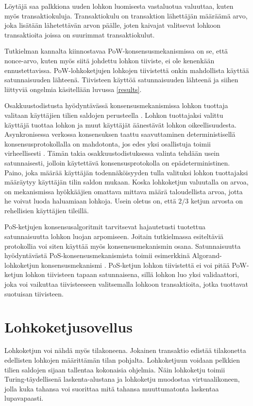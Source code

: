 Löytäjä saa palkkiona uuden lohkon luomisesta vastaluotua valuuttaa, kuten myös transaktiokuluja. Transaktiokulu on transaktion lähettäjän määräämä arvo, joka lisätään lähetettävän arvon päälle, joten kaivajat valitsevat lohkoon transaktioita joissa on suurimmat transaktiokulut.

Tutkielman kannalta kiinnostavaa PoW-konsensusmekanismissa on se, että nonce-arvo, kuten myös siitä johdettu lohkon tiiviste, ei ole kenenkään ennustettavissa. PoW-lohkoketjujen lohkojen tiivistettä onkin mahdollista käyttää satunnaisuuden lähteenä. Tiivisteen käyttöä satunnaisuuden lähteenä ja siihen liittyviä ongelmia käsitellään luvussa \ref{results}.


Osakkuustodistusta hyödyntävässä konsensusmekanismissa lohkon tuottaja valitaan käyttäjien tilien saldojen perusteella \cite{NguyenCongT2019PCMf}. Lohkon tuottajaksi valittu käyttäjä tuottaa lohkon ja muut käyttäjät äänestävät lohkon oikeellisuudesta. Asynkronisessa verkossa konsensuksen taattu saavuttaminen deterministisellä konsensusprotokollalla on mahdotonta, jos edes yksi osallistuja toimii virheellisesti \cite{fischer_impossibility_1985}. Tämän takia osakkuustodistuksessa valinta tehdään usein satunnaisesti, jolloin käytettävä konsensusprotokolla on epädeterministinen. Paino, joka määrää käyttäjän todennäköisyyden tulla valituksi lohkon tuottajaksi määräytyy käyttäjän tilin saldon mukaan. Koska lohkoketjun valuutalla on arvoa, on mekanismissa hyökkääjien omattava mittava määrä taloudellista arvoa, jotta he voivat luoda haluamiaan lohkoja. Usein oletus on, että $2/3$ ketjun arvosta on rehellisien käyttäjien tileillä. 

 PoS-ketjujen konsensusalgoritmit tarvitsevat hajautetusti tuotettua satunnaisuutta lohkon luojan arpomiseen. Joitain tutkielmassa esiteltäviä protokollia voi siten käyttää myös konsensusmekanismin osana. Satunnaisuutta hyödyntävästä PoS-konsensusmekanismista toimii esimerkkinä Algorand-lohkoketjun konsensusmekanismi \cite{gilad_algorand_2017}. PoS-ketjun lohkon tiivistettä ei voi pitää PoW-ketjun lohkon tiivisteen tapaan satunnaisena, sillä lohkon luo yksi validaattori, joka voi vaikuttaa tiivisteeseen valitsemalla lohkoon transaktioita, jotka tuottavat suotuisan tiivisteen.

\section{Lohkoketjusovellus}

Lohkoketjun voi nähdä myös tilakoneena. Jokainen transaktio edistää tilakonetta edellisten lohkojen määrittämän tilan pohjalta. Lohkoketjuun voidaan pelkkien tilien saldojen sijaan tallentaa kokonaisia ohjelmia. Näin lohkoketju toimii Turing-täydellisenä laskenta-alustana ja lohkoketju muodostaa virtuaalikoneen, jolla kuka tahansa voi suorittaa mitä tahansa muuttumatonta laskentaa lupavapaasti.

